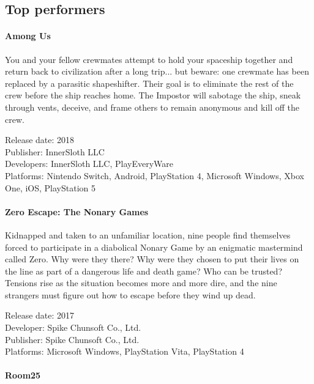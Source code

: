\subsection{Top performers}

\paragraph{Among Us}

You and your fellow crewmates attempt to hold your spaceship together and return back to civilization after a long trip... but beware: one crewmate has been replaced by a parasitic shapeshifter. Their goal is to eliminate the rest of the crew before the ship reaches home. The Impostor will sabotage the ship, sneak through vents, deceive, and frame others to remain anonymous and kill off the crew.


Release date: 2018 \\
Publisher: InnerSloth LLC \\
Developers: InnerSloth LLC, PlayEveryWare \\ 
Platforms: Nintendo Switch, Android, PlayStation 4, Microsoft Windows, Xbox One, iOS, PlayStation 5 \\

\paragraph{Zero Escape: The Nonary Games}

Kidnapped and taken to an unfamiliar location, nine people find themselves forced to participate in a diabolical Nonary Game by an enigmatic mastermind called Zero. Why were they there? Why were they chosen to put their lives on the line as part of a dangerous life and death game? Who can be trusted? Tensions rise as the situation becomes more and more dire, and the nine strangers must figure out how to escape before they wind up dead.


Release date: 2017 \\
Developer: Spike Chunsoft Co., Ltd. \\
Publisher: Spike Chunsoft Co., Ltd. \\
Platforms: Microsoft Windows, PlayStation Vita, PlayStation 4 \\


\paragraph{Room25}

